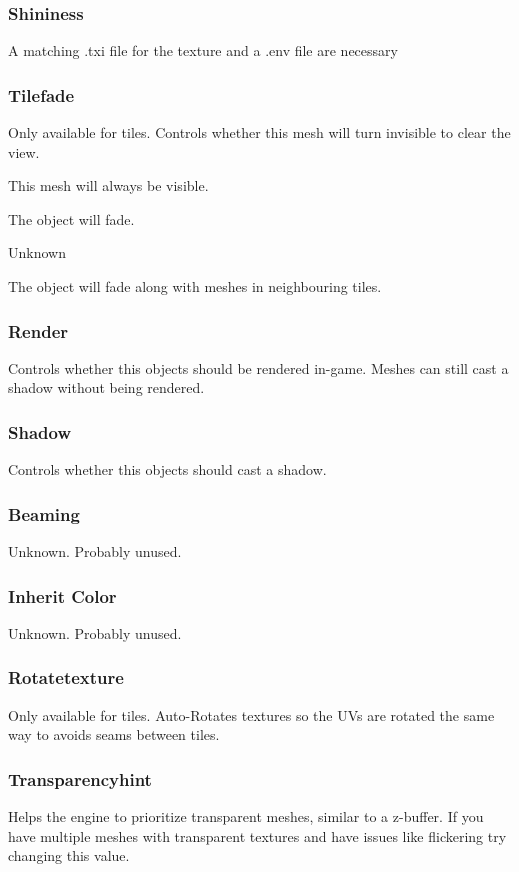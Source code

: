 \subsubsection*{Shininess}
A matching .txi file for the texture and a .env file are necessary

\subsubsection*{Tilefade}
Only available for tiles. Controls whether this mesh will turn invisible to
clear the view.
\begin{description}[leftmargin=6em,style=nextline]
    \item[None] This mesh will always be visible.
    \item[Fade] The object will fade.
    \item[Base] Unknown
    \item[Neighbour] The object will fade along with meshes in neighbouring tiles.
\end{description}

\subsubsection*{Render}
Controls whether this objects should be rendered in-game. Meshes can still
cast a shadow without being rendered.

\subsubsection*{Shadow}
Controls whether this objects should cast a shadow.

\subsubsection*{Beaming}
Unknown. Probably unused.

\subsubsection*{Inherit Color}
Unknown. Probably unused.

\subsubsection*{Rotatetexture}
Only available for tiles. Auto-Rotates textures so the UVs are rotated
the same way to avoids seams between tiles.

\subsubsection*{Transparencyhint}
Helps the engine to prioritize transparent meshes, similar to a z-buffer. If
you have multiple meshes with transparent textures and have issues like
flickering try changing this value.

